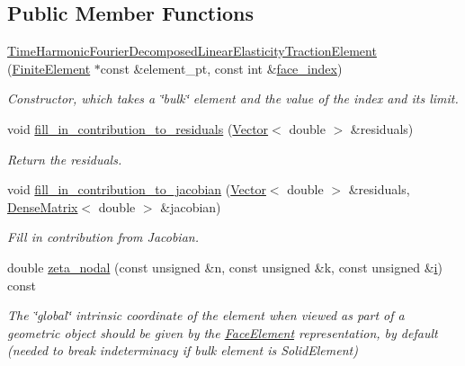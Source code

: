 \subsection*{Public Member Functions}
\begin{DoxyCompactItemize}
\item 
\hyperlink{classoomph_1_1TimeHarmonicFourierDecomposedLinearElasticityTractionElement_a3359f1d578853a9f733c981148a408d8}{Time\+Harmonic\+Fourier\+Decomposed\+Linear\+Elasticity\+Traction\+Element} (\hyperlink{classoomph_1_1FiniteElement}{Finite\+Element} $\ast$const \&element\+\_\+pt, const int \&\hyperlink{classoomph_1_1FaceElement_a478d577ac6db67ecc80f1f02ae3ab170}{face\+\_\+index})
\begin{DoxyCompactList}\small\item\em Constructor, which takes a \char`\"{}bulk\char`\"{} element and the value of the index and its limit. \end{DoxyCompactList}\item 
void \hyperlink{classoomph_1_1TimeHarmonicFourierDecomposedLinearElasticityTractionElement_aef049545e30cf7b9b0409d84606022a7}{fill\+\_\+in\+\_\+contribution\+\_\+to\+\_\+residuals} (\hyperlink{classoomph_1_1Vector}{Vector}$<$ double $>$ \&residuals)
\begin{DoxyCompactList}\small\item\em Return the residuals. \end{DoxyCompactList}\item 
void \hyperlink{classoomph_1_1TimeHarmonicFourierDecomposedLinearElasticityTractionElement_a4f179e4db7ec168346089fb1b75fbdc8}{fill\+\_\+in\+\_\+contribution\+\_\+to\+\_\+jacobian} (\hyperlink{classoomph_1_1Vector}{Vector}$<$ double $>$ \&residuals, \hyperlink{classoomph_1_1DenseMatrix}{Dense\+Matrix}$<$ double $>$ \&jacobian)
\begin{DoxyCompactList}\small\item\em Fill in contribution from Jacobian. \end{DoxyCompactList}\item 
double \hyperlink{classoomph_1_1TimeHarmonicFourierDecomposedLinearElasticityTractionElement_aac54793d84bff0a227ee5fefa279b7ad}{zeta\+\_\+nodal} (const unsigned \&n, const unsigned \&k, const unsigned \&\hyperlink{cfortran_8h_adb50e893b86b3e55e751a42eab3cba82}{i}) const
\begin{DoxyCompactList}\small\item\em The \char`\"{}global\char`\"{} intrinsic coordinate of the element when viewed as part of a geometric object should be given by the \hyperlink{classoomph_1_1FaceElement}{Face\+Element} representation, by default (needed to break indeterminacy if bulk element is Solid\+Element) \end{DoxyCompactList}\item 

\end{DoxyCompactItemize}
